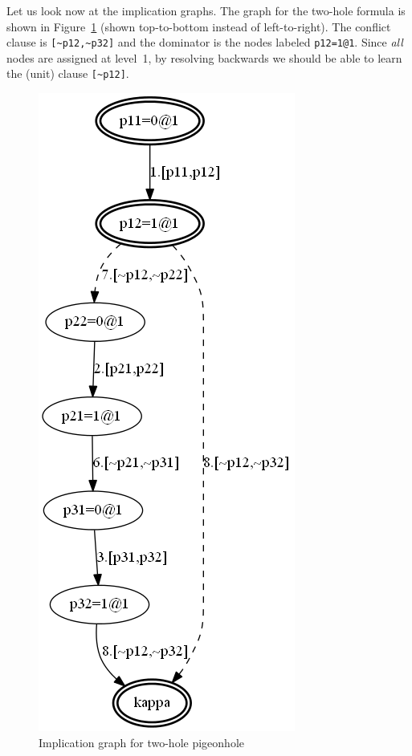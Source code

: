 \documentclass[11pt]{report}
\begin{document}
Let us look now at the implication graphs. The graph for the two-hole
formula is shown in Figure~\ref{pigeon2} (shown top-to-bottom instead of
left-to-right). The conflict clause is \verb+[~p12,~p32]+ and the
dominator is the nodes labeled \verb+p12=1@1+. Since \emph{all} nodes
are assigned at level~1, by resolving backwards we should be able to
learn the (unit) clause \verb+[~p12]+.

\begin{figure}
\begin{center}
\includegraphics[keepaspectratio=true,height=.9\textheight]{pigeon2-bw}
\end{center}
\caption{Implication graph for two-hole pigeonhole}\label{pigeon2}
\end{figure}
\end{document}
